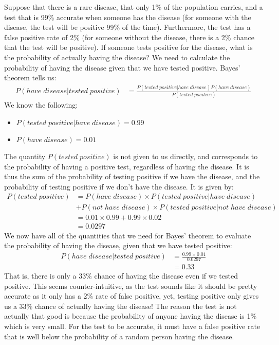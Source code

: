 \begin{example}{}{Suppose that there is a rare disease, that only 1\% of the population carries, and a test that is 99\% accurate when someone has the disease (for someone with the disease, the test will be positive 99\% of the time). Furthermore, the test has a false positive rate of 2\% (for someone without the disease, there is a 2\% chance that the test will be positive). If someone tests positive for the disease, what is the probability of actually having the disease?}{}
\label{ex:BayesDisease}
We need to calculate the probability of having the disease given that we have tested positive. Bayes' theorem tells us:
\begin{align*}
P(have\; disease|tested\; positive) &= \frac{P(tested\; positive | have\; disease)P(have\; disease)}{P(tested\; positive)}
\end{align*}
We know the following:
\begin{itemize}
\item $P(tested\; positive | have\; disease)=0.99$
\item $P(have\; disease)=0.01$
\end{itemize}
The quantity $P(tested\; positive)$ is not given to us directly, and corresponds to the probability of having a positive test, regardless of having the disease. It is thus the sum of the probability of testing positive if we have the disease, and the probability of testing positive if we don't have the disease. It is given by:
\begin{align*}
P(tested\; positive) &= P(have\;disease)\times P(tested\; positive | have\; disease)\\
&+ P(not\;have\;disease)\times P(tested\; positive |not\; have\; disease)\\
&=0.01\times 0.99 + 0.99 \times 0.02\\
&=0.0297
\end{align*}
We now have all of the quantities that we need for Bayes' theorem to evaluate the probability of having the disease, given that we have tested positive:
\begin{align*}
P(have\; disease|tested\; positive) &= \frac{0.99\times0.01}{0.0297}\\
&=0.33
\end{align*}
That is, there is only a 33\% chance of having the disease even if we tested positive. This seems counter-intuitive, as the test sounds like it should be pretty accurate as it only has a 2\% rate of false positive, yet, testing positive only gives us a 33\% chance of actually having the disease! The reason the test is not actually that good is because the probability of anyone having the disease is 1\% which is very small. For the test to be accurate, it must have a false positive rate that is well below the probability of a random person having the disease.
\end{example}

